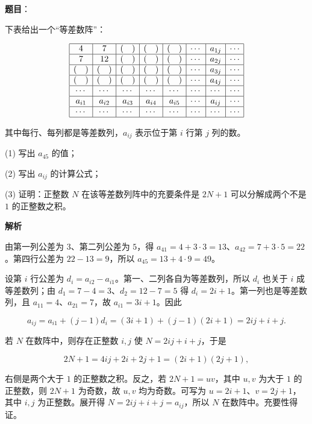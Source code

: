 \begin{answer}

\textbf{题目}：

下表给出一个“等差数阵”：

\nopagebreak[4]
\[
\begin{array}{|c|c|c|c|c|c|c|c|}
\hline
4 & 7 & (\quad) & (\quad) & (\quad) & \cdots & a_{1j} & \cdots \\ \hline
7 & 12 & (\quad) & (\quad) & (\quad) & \cdots & a_{2j} & \cdots \\ \hline
(\quad) & (\quad) & (\quad) & (\quad) & (\quad) & \cdots & a_{3j} & \cdots \\ \hline
(\quad) & (\quad) & (\quad) & (\quad) & (\quad) & \cdots & a_{4j} & \cdots \\ \hline
\cdots & \cdots & \cdots & \cdots & \cdots & \cdots & \cdots & \cdots \\ \hline
a_{i1} & a_{i2} & a_{i3} & a_{i4} & a_{i5} & \cdots & a_{ij} & \cdots \\ \hline
\cdots & \cdots & \cdots & \cdots & \cdots & \cdots & \cdots & \cdots \\ \hline
\end{array}
\]

其中每行、每列都是等差数列，$a_{ij}$ 表示位于第 $i$ 行第 $j$ 列的数。

(1) 写出 $a_{45}$ 的值；

(2) 写出 $a_{ij}$ 的计算公式；

(3) 证明：正整数 $N$ 在该等差数列阵中的充要条件是 $2N+1$ 可以分解成两个不是 $1$ 的正整数之积。

\textbf{解析}


由第一列公差为 $3$、第二列公差为 $5$，得 $a_{41}=4+3\cdot3=13$、$a_{42}=7+3\cdot5=22$。第四行公差为 $22-13=9$，所以 $a_{45}=13+4\cdot9=49$。


设第 $i$ 行公差为 $d_i=a_{i2}-a_{i1}$。第一、二列各自为等差数列，所以 $d_i$ 也关于 $i$ 成等差数列；由 $d_1=7-4=3$、$d_2=12-7=5$ 得 $d_i=2i+1$。第一列也是等差数列，且 $a_{11}=4$、$a_{21}=7$，故 $a_{i1}=3i+1$。因此

\nopagebreak[4]
\[
a_{ij}=a_{i1}+(j-1)d_i=(3i+1)+(j-1)(2i+1)=2ij+i+j.
\]


若 $N$ 在数阵中，则存在正整数 $i,j$ 使 $N=2ij+i+j$，于是

\nopagebreak[4]
\[
2N+1=4ij+2i+2j+1=(2i+1)(2j+1),
\]

右侧是两个大于 $1$ 的正整数之积。反之，若 $2N+1=uv$，其中 $u,v$ 为大于 $1$ 的正整数，则 $2N+1$ 为奇数，故 $u,v$ 均为奇数。可写为 $u=2i+1$、$v=2j+1$，其中 $i,j$ 为正整数。展开得 $N=2ij+i+j=a_{ij}$，所以 $N$ 在数阵中。充要性得证。




\end{answer}